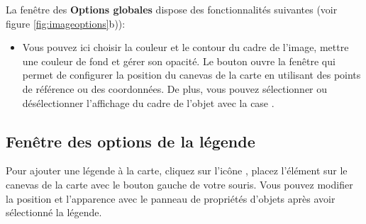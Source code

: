 
La fenêtre des \textbf{Options globales} dispose des fonctionnalités suivantes (voir figure \ref{fig:imageoptions}b)):

\begin{itemize}[label=--]
\item Vous pouvez ici choisir la couleur et le contour du cadre de l'image, mettre une couleur de fond et gérer son opacité. Le bouton  ouvre la fenêtre  qui permet de configurer la position du canevas de la carte en utilisant des points de référence ou des coordonnées. De plus, vous pouvez sélectionner ou désélectionner l'affichage du cadre de l'objet avec la case .
\end{itemize}

\subsection{Fenêtre des options de la légende}

Pour ajouter une légende à la carte, cliquez sur l'icône , placez l'élément sur le canevas de la carte avec le bouton gauche de votre souris. Vous pouvez modifier la position et l'apparence avec le panneau de propriétés d'objets après avoir sélectionné la légende.

